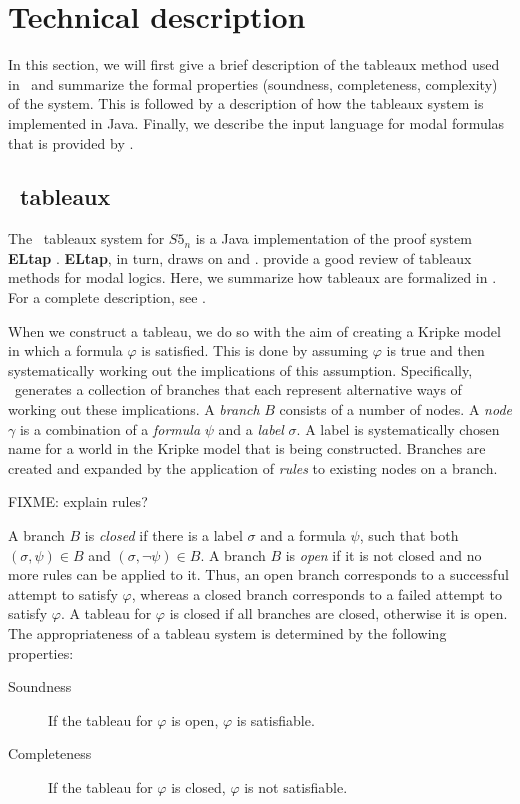 \section{Technical description}

In this section, we will first give a brief description of the tableaux method
used in \oops\ and summarize the formal properties (soundness, completeness,
complexity) of the system. This is followed by a description of how the
tableaux system is implemented in Java. Finally, we describe the input language
for modal formulas that is provided by \oops.

\subsection{\oops\ tableaux}

The \oops\ tableaux system for $S5_n$ is a Java \citep{gosling2005}
implementation of the proof system {\bf ELtap} \citep{deboer2006}.  {\bf
ELtap}, in turn, draws on \citet{fitting1999} and \citet{beckert1997}.
\citet{halpern1992} provide a good review of tableaux methods for modal logics.
Here, we summarize how tableaux are formalized in \oops. For a complete
description, see \citet{valkenhoef2008}.

When we construct a tableau, we do so with the aim of creating a Kripke model
in which a formula $\varphi$ is satisfied. This is done by assuming $\varphi$
is true and then systematically working out the implications of this
assumption. Specifically, \oops\ generates a collection of branches that each
represent alternative ways of working out these implications. A {\em branch}
$B$ consists of a number of nodes. A {\em node} $\gamma$ is a combination of a
{\em formula} $\psi$ and a {\em label} $\sigma$. A label is systematically
chosen name for a world in the Kripke model that is being constructed. Branches
are created and expanded by the application of {\em rules} to existing nodes on
a branch. 

FIXME: explain rules?

A branch $B$ is {\em closed} if there is a label $\sigma$ and a formula
$\psi$, such that both $(\sigma, \psi) \in B$ and $(\sigma, \neg \psi)
\in B$. A branch $B$ is {\em open} if it is not closed and no more rules can be
applied to it. Thus, an open branch corresponds to a successful attempt to
satisfy $\varphi$, whereas a closed branch corresponds to a failed attempt to
satisfy $\varphi$. A tableau for $\varphi$ is closed if all branches are
closed, otherwise it is open. The appropriateness of a tableau system is
determined by the following properties:
\begin{description}
\item[Soundness] If the tableau for $\varphi$ is open, $\varphi$ is satisfiable.
\item[Completeness] If the tableau for $\varphi$ is closed, $\varphi$ is not
satisfiable.
\end{description}

